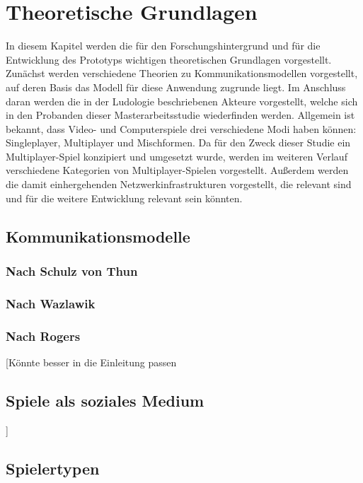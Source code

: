 \chapter{Theoretische Grundlagen}

In diesem Kapitel werden die für den Forschungshintergrund und für die Entwicklung des Prototyps wichtigen theoretischen Grundlagen vorgestellt.
Zunächst werden verschiedene Theorien zu Kommunikationsmodellen vorgestellt, auf deren Basis das Modell für diese Anwendung zugrunde liegt.
Im Anschluss daran werden die in der Ludologie beschriebenen Akteure vorgestellt, welche sich in den Probanden dieser Masterarbeitsstudie wiederfinden werden. Allgemein ist bekannt, dass Video- und Computerspiele drei verschiedene Modi haben können: Singleplayer, Multiplayer und Mischformen. Da für den Zweck dieser Studie ein Multiplayer-Spiel konzipiert und umgesetzt wurde, werden im weiteren Verlauf verschiedene Kategorien von Multiplayer-Spielen vorgestellt. Außerdem werden die damit einhergehenden Netzwerkinfrastrukturen vorgestellt, die relevant sind und für die weitere Entwicklung relevant sein könnten.

\section{Kommunikationsmodelle}

\subsection{Nach Schulz von Thun}
\subsection{Nach Wazlawik}
\subsection{Nach Rogers}

[Könnte besser in die Einleitung passen
\section{Spiele als soziales Medium}
\cite{depping_trust_2016}
\cite{gerling_designing_2014}
\cite{ducheneaut_alone_2006}
]

\section{Spielertypen}

